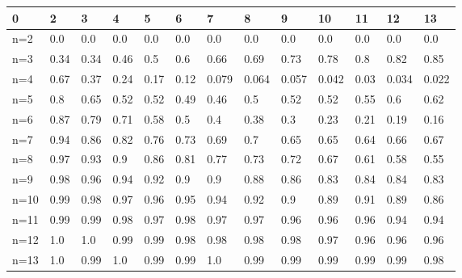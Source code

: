 \begin{tabular}{l|llllllllllll}
\toprule 
0 & 2 & 3 & 4 & 5 & 6 & 7 & 8 & 9 & 10 & 11 & 12 & 13 \\
\hline 
n=2 & 0.0 & 0.0 & 0.0 & 0.0 & 0.0 & 0.0 & 0.0 & 0.0 & 0.0 & 0.0 & 0.0 & 0.0 \\
n=3 & 0.34 & 0.34 & 0.46 & 0.5 & 0.6 & 0.66 & 0.69 & 0.73 & 0.78 & 0.8 & 0.82 & 0.85 \\
n=4 & 0.67 & 0.37 & 0.24 & 0.17 & 0.12 & 0.079 & 0.064 & 0.057 & 0.042 & 0.03 & 0.034 & 0.022 \\
n=5 & 0.8 & 0.65 & 0.52 & 0.52 & 0.49 & 0.46 & 0.5 & 0.52 & 0.52 & 0.55 & 0.6 & 0.62 \\
n=6 & 0.87 & 0.79 & 0.71 & 0.58 & 0.5 & 0.4 & 0.38 & 0.3 & 0.23 & 0.21 & 0.19 & 0.16 \\
n=7 & 0.94 & 0.86 & 0.82 & 0.76 & 0.73 & 0.69 & 0.7 & 0.65 & 0.65 & 0.64 & 0.66 & 0.67 \\
n=8 & 0.97 & 0.93 & 0.9 & 0.86 & 0.81 & 0.77 & 0.73 & 0.72 & 0.67 & 0.61 & 0.58 & 0.55 \\
n=9 & 0.98 & 0.96 & 0.94 & 0.92 & 0.9 & 0.9 & 0.88 & 0.86 & 0.83 & 0.84 & 0.84 & 0.83 \\
n=10 & 0.99 & 0.98 & 0.97 & 0.96 & 0.95 & 0.94 & 0.92 & 0.9 & 0.89 & 0.91 & 0.89 & 0.86 \\
n=11 & 0.99 & 0.99 & 0.98 & 0.97 & 0.98 & 0.97 & 0.97 & 0.96 & 0.96 & 0.96 & 0.94 & 0.94 \\
n=12 & 1.0 & 1.0 & 0.99 & 0.99 & 0.98 & 0.98 & 0.98 & 0.98 & 0.97 & 0.96 & 0.96 & 0.96 \\
n=13 & 1.0 & 0.99 & 1.0 & 0.99 & 0.99 & 1.0 & 0.99 & 0.99 & 0.99 & 0.99 & 0.99 & 0.98 \\
\bottomrule 
\end{tabular}
